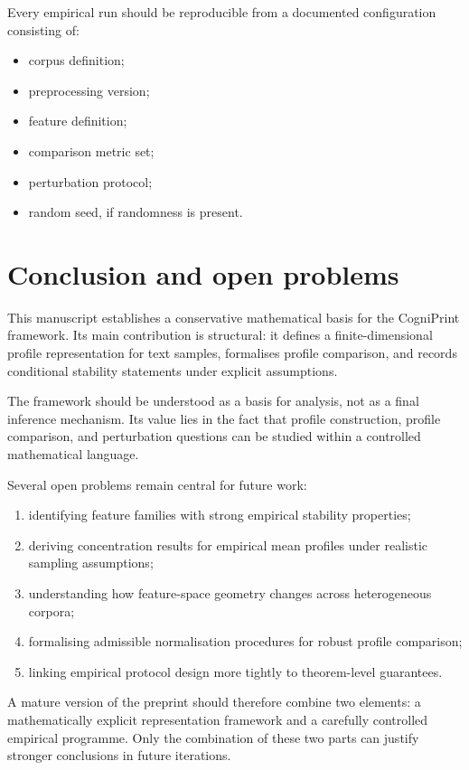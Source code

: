\documentclass[11pt]{article}
\begin{document}
Every empirical run should be reproducible from a documented configuration consisting of:
\begin{itemize}
    \item corpus definition;
    \item preprocessing version;
    \item feature definition;
    \item comparison metric set;
    \item perturbation protocol;
    \item random seed, if randomness is present.
\end{itemize}

\section{Conclusion and open problems}

This manuscript establishes a conservative mathematical basis for the CogniPrint framework. Its main contribution is structural: it defines a finite-dimensional profile representation for text samples, formalises profile comparison, and records conditional stability statements under explicit assumptions.

The framework should be understood as a basis for analysis, not as a final inference mechanism. Its value lies in the fact that profile construction, profile comparison, and perturbation questions can be studied within a controlled mathematical language.

Several open problems remain central for future work:
\begin{enumerate}[label=\arabic*.]
    \item identifying feature families with strong empirical stability properties;
    \item deriving concentration results for empirical mean profiles under realistic sampling assumptions;
    \item understanding how feature-space geometry changes across heterogeneous corpora;
    \item formalising admissible normalisation procedures for robust profile comparison;
    \item linking empirical protocol design more tightly to theorem-level guarantees.
\end{enumerate}

A mature version of the preprint should therefore combine two elements: a mathematically explicit representation framework and a carefully controlled empirical programme. Only the combination of these two parts can justify stronger conclusions in future iterations.
\end{document}
